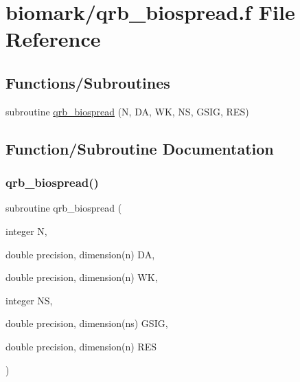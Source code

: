 \hypertarget{qrb__biospread_8f}{}\section{biomark/qrb\+\_\+biospread.f File Reference}
\label{qrb__biospread_8f}
\subsection*{Functions/\+Subroutines}
\begin{DoxyCompactItemize}
\item 
subroutine \hyperlink{qrb__biospread_8f_ad5f8d9a5085eea9e8e6577b8e3358884}{qrb\+\_\+biospread} (N, DA, WK, NS, G\+S\+IG, R\+ES)
\end{DoxyCompactItemize}


\subsection{Function/\+Subroutine Documentation}
\mbox{\label{qrb__biospread_8f_ad5f8d9a5085eea9e8e6577b8e3358884}} 
\subsubsection{\texorpdfstring{qrb\+\_\+biospread()}{qrb\_biospread()}}
{\footnotesize\ttfamily subroutine qrb\+\_\+biospread (\begin{DoxyParamCaption}\item[{integer}]{N,  }\item[{double precision, dimension(n)}]{DA,  }\item[{double precision, dimension(n)}]{WK,  }\item[{integer}]{NS,  }\item[{double precision, dimension(ns)}]{G\+S\+IG,  }\item[{double precision, dimension(n)}]{R\+ES }\end{DoxyParamCaption})}

